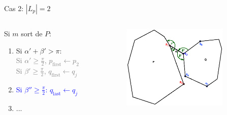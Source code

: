 \documentclass{beamer}
\begin{document}
\begin{frame}{Cas 2: $|L_p| = 2$}
	\begin{columns}[c]
	\begin{column}[T]{.5\textwidth}
		Si $m$ sort de $P$:
		\begin{enumerate}
		\item Si $\alpha' + \beta' > \pi$: \\
			\hspace{0.3cm} \textcolor{gray}{Si $\alpha' \geq \frac{\pi}{2}$, $p_{\text{first}} \leftarrow p_{2}$}\\
			\hspace{0.3cm} \textcolor{gray}{Si $\beta' \geq \frac{\pi}{2}$, $q_{\text{first}} \leftarrow q_{j}$}
		\item \textcolor{blue}{Si $\beta'' \geq \frac{\pi}{2}$: $q_{\text{last}} \leftarrow q_{j}$}
		\item ...
		\end{enumerate}
	\end{column}
	\begin{column}[T]{.5\textwidth}
		\includegraphics[width=5cm]{dmin2_3.eps}
	\end{column}
	\end{columns}
\end{frame}
\end{document}
